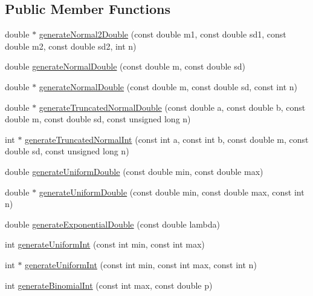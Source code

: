\subsection*{Public Member Functions}
\begin{DoxyCompactItemize}
\item 
double $\ast$ \hyperlink{class_random_number_generator_a6a8cdbfdb3343a10aab18b83fc6ce0dc}{generate\+Normal2\+Double} (const double m1, const double sd1, const double m2, const double sd2, int n)
\item 
double \hyperlink{class_random_number_generator_a2598d9959bf595c3703c1d8e24f6e2f1}{generate\+Normal\+Double} (const double m, const double sd)
\item 
double $\ast$ \hyperlink{class_random_number_generator_a8a08591104b4fd1943eade351aa126c9}{generate\+Normal\+Double} (const double m, const double sd, const int n)
\item 
double $\ast$ \hyperlink{class_random_number_generator_a4e0cc6be3677ba52821cd4e0ae92cca9}{generate\+Truncated\+Normal\+Double} (const double a, const double b, const double m, const double sd, const unsigned long n)
\item 
int $\ast$ \hyperlink{class_random_number_generator_a9204cf57bae1189b576307699b07747b}{generate\+Truncated\+Normal\+Int} (const int a, const int b, const double m, const double sd, const unsigned long n)
\item 
double \hyperlink{class_random_number_generator_a0cbfb491d75d113c5bd0816576cb56ed}{generate\+Uniform\+Double} (const double min, const double max)
\item 
double $\ast$ \hyperlink{class_random_number_generator_a208c3dcccf6aa6a62151a98d58264d08}{generate\+Uniform\+Double} (const double min, const double max, const int n)
\item 
double \hyperlink{class_random_number_generator_a95d897f9265ece8d5ee18fbf2802b844}{generate\+Exponential\+Double} (const double lambda)
\item 
int \hyperlink{class_random_number_generator_aa2dd0dd9e4b520517cd31466c7066a0a}{generate\+Uniform\+Int} (const int min, const int max)
\item 
int $\ast$ \hyperlink{class_random_number_generator_a5a3645c649783d3208319a016f744c5f}{generate\+Uniform\+Int} (const int min, const int max, const int n)
\item 
int \hyperlink{class_random_number_generator_a417f97fb1a4362621b60107d98c3b4e7}{generate\+Binomial\+Int} (const int max, const double p)
\item 

\end{DoxyCompactItemize}
